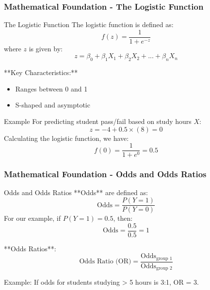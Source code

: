 \documentclass[aspectratio=169]{beamer}
\begin{document}
\begin{frame}[fragile]
    \frametitle{Mathematical Foundation - The Logistic Function}
    \begin{block}{The Logistic Function}
        The logistic function is defined as:
        \begin{equation}
            f(z) = \frac{1}{1 + e^{-z}}
        \end{equation}
        where \( z \) is given by:
        \begin{equation}
            z = \beta_0 + \beta_1X_1 + \beta_2X_2 + ... + \beta_nX_n
        \end{equation}
        
        **Key Characteristics:**
        \begin{itemize}
            \item Ranges between 0 and 1
            \item S-shaped and asymptotic
        \end{itemize}
    \end{block}
    \begin{block}{Example}
        For predicting student pass/fail based on study hours \( X \):
        \begin{equation}
            z = -4 + 0.5 \times (8) = 0
        \end{equation}
        Calculating the logistic function, we have:
        \begin{equation}
            f(0) = \frac{1}{1 + e^{0}} = 0.5
        \end{equation}
    \end{block}
\end{frame}

\begin{frame}[fragile]
    \frametitle{Mathematical Foundation - Odds and Odds Ratios}
    \begin{block}{Odds and Odds Ratios}
        **Odds** are defined as:
        \begin{equation}
            \text{Odds} = \frac{P(Y=1)}{P(Y=0)}
        \end{equation}
        For our example, if \( P(Y=1) = 0.5 \), then:
        \begin{equation}
            \text{Odds} = \frac{0.5}{0.5} = 1
        \end{equation}

        **Odds Ratios**:
        \begin{equation}
            \text{Odds Ratio (OR)} = \frac{\text{Odds}_{\text{group 1}}}{\text{Odds}_{\text{group 2}}}
        \end{equation}

        Example: If odds for students studying > 5 hours is 3:1, OR = 3.
    \end{block}
\end{frame}
\end{document}
